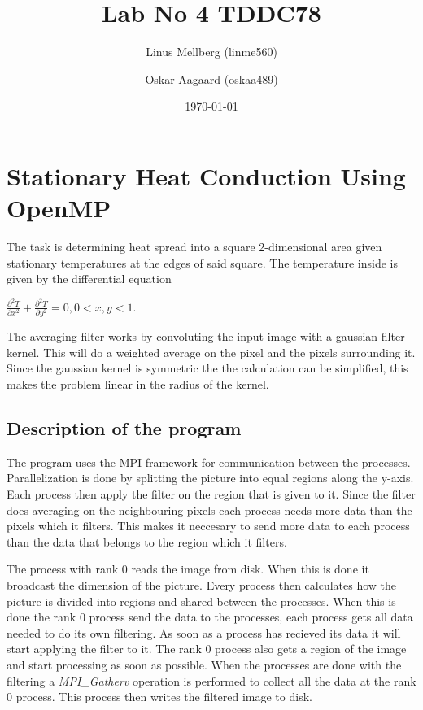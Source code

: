 \documentclass[a4paper,11pt]{article}
\begin{document}
\title{Lab No 4 TDDC78}
\author{Linus Mellberg (linme560) \and Oskar Aagaard (oskaa489)}
\date{\today}
\maketitle
\pagebreak
\thispagestyle{tcr}
\pagestyle{tcr}

\section{Stationary Heat Conduction Using OpenMP}
The task is determining heat spread into a square 2-dimensional area given stationary temperatures at the edges of said square. The temperature inside is given by the differential equation 

\begin{math}
\label{diff_eq}
\frac{\partial ^2T}{\partial x^2} + \frac{\partial ^2T}{\partial y^2} = 0, 0 < x,y < 1.
\end{math}


The averaging filter works by convoluting the input image with a gaussian filter kernel.
This will do a weighted average on the pixel and the pixels surrounding it.
Since the gaussian kernel is symmetric the the calculation can be simplified, this makes the problem linear in the radius of the kernel.
\subsection{Description of the program}
The program uses the MPI framework for communication between the processes.
Parallelization is done by splitting the picture into equal regions along the y-axis.
Each process then apply the filter on the region that is given to it. 
Since the filter does averaging on the neighbouring pixels each process needs more data than the pixels which it filters.
This makes it neccesary to send more data to each process than the data that belongs to the region which it filters.

The process with rank 0 reads the image from disk.
When this is done it broadcast the dimension of the picture.
Every process then calculates how the picture is divided into regions and shared between the processes.
When this is done the rank 0 process send the data to the processes, each process gets all data needed to do its own filtering.
As soon as a process has recieved its data it will start applying the filter to it.
The rank 0 process also gets a region of the image and start processing as soon as possible.
When the processes are done with the filtering a \emph{MPI\_Gatherv} operation is performed to collect all the data at the rank 0 process.
This process then writes the filtered image to disk.
\end{document}
